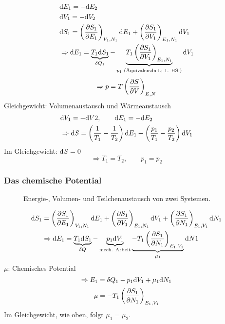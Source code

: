 \begin{equation}
    \begin{split}
        & \mathrm{d} E_1 = - \mathrm{d} E_2 \\
        & \mathrm{d} V_1 = - \mathrm{d} V_2 \\
        & \mathrm{d} S_1 = \left( \frac{\partial S_1}{\partial E_1} \right)_{V_1, N_1} \mathrm{d} E_1 + \left( \frac{\partial S_1}{\partial V_1} \right)_{E_1, N_1} \mathrm{d} V_1 \\
        & \Rightarrow \mathrm{d} E_1 = \underbrace{T_1 \mathrm{d} S_1}_{\delta Q_1} - \underbrace{T_1 \left( \frac{\partial S_1}{\partial V_1} \right)_{E_1, N_1}}_{p_1 \text{ (Äquivalenzbet.; 1. HS.)}} \mathrm{d} V_1
    \end{split}
\end{equation}
\begin{equation}
    \Rightarrow p = T \left( \frac{\partial S}{\partial V} \right)_{E, N}
\end{equation}
Gleichgewicht: Volumenaustausch und Wärmeaustausch
\begin{equation}
    \begin{split}
        & \mathrm{d} V_1 = - \mathrm{d} V2, \qquad \mathrm{d} E_1 = - \mathrm{d} E_2 \\
        & \Rightarrow \mathrm{d} S = \left( \frac{1}{T_1} - \frac{1}{T_2} \right) \mathrm{d} E_1 + \left( \frac{p_1}{T_1} - \frac{p_2}{T_2} \right) \mathrm{d} V_1
    \end{split}
\end{equation}
Im Gleichgewicht: $\mathrm{d} S = 0$
\begin{equation}
    \Rightarrow T_1 = T_2 , \qquad p_1 = p_2
\end{equation}
\subsubsection{Das chemische Potential}

    \begin{figure}[H]
        \centering
        \def\svgwidth{0.85\textwidth}
        
        \caption{Energie-, Volumen- und Teilchenaustausch von zwei Systemen.}
        \label{img:derivationMu}
    \end{figure}

\begin{equation} 
    \begin{split}
        \mathrm{d} S_1 &= \left( \frac{\partial S_1}{\partial E_1} \right)_{V_1, N_1} \mathrm{d} E_1 + \left( \frac{\partial S_1}{\partial V_1} \right)_{E_1, N_1} \mathrm{d} V_1 + \left( \frac{\partial S_1}{\partial N_1} \right)_{E_1, V_1} \mathrm{d} N_1 \\
        & \Rightarrow \mathrm{d} E_1 = \underbrace{T_1 \mathrm{d} S_1}_{\delta Q} - \underbrace{p_1 \mathrm{d} V_1}_{\text{mech. Arbeit}}
        \underbrace{- T_1 \left( \frac{\partial S_1}{\partial N_1} \right)_{E_1, V_1}}_{\mu_1} \mathrm{d} N1
    \end{split}
\end{equation}
$\mu$: Chemisches Potential
\begin{equation}
    \Rightarrow E_1 = \delta Q_1 - p_1 \mathrm{d} V_1 + \mu_1 \mathrm{d} N_1
\end{equation}
\begin{equation}
    \mu = - T_1 \left( \frac{\partial S_1}{\partial N_1} \right)_{E_1, V_1}
\end{equation}
Im Gleichgewicht, wie oben, folgt $\mu_1 = \mu_2$.

